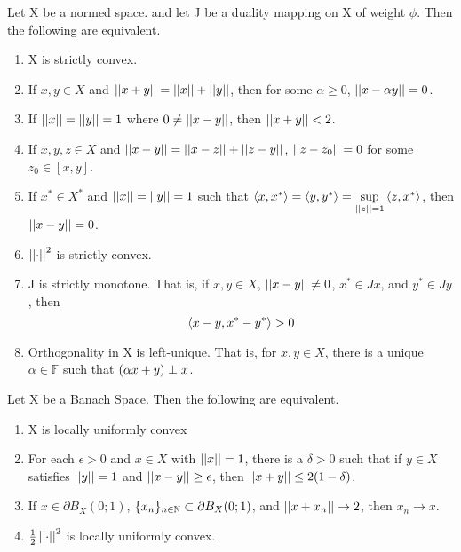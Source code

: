 \begin{prop}
    \label{prop:strictlyconvexspaces}
    Let X be a normed space. and let J be a duality mapping on X of weight $\phi$. Then the following are equivalent. 
    \begin{enumerate}
        \item X is strictly convex.
        \item If $x,y \in X$ and $\left|\left| x+y \right|\right| = \left|\left| x \right|\right|+\left|\left| y \right|\right|$, then for some $\alpha \geq 0$,  $\left|\left| x-\alpha y \right|\right| = 0$. 
        \item If $\left|\left| x \right|\right|=\left|\left| y \right|\right|=1$ where $0 \neq \left|\left| x-y \right|\right|$, then $\left|\left| x+y \right|\right| < 2$. 
        \item If $x,y,z \in X$ and $\left|\left| x-y \right|\right|= \left|\left| x-z \right|\right|+\left|\left| z-y \right|\right|$, $\left|\left| z-z_0 \right|\right|=0$ for some $z_0 \in [x,y]$. 
        \item If $x^* \in X^*$ and $\left|\left| x \right|\right|=\left|\left| y \right|\right|=1$ such that $\left\langle x,x^* \right\rangle=\left\langle y,y^* \right\rangle = \sup\limits_{\left|\left| z \right|\right|=1}\left\langle z,x^* \right\rangle$, then $\left|\left| x-y \right|\right|=0$. 
        \item $\left|\left| \cdot \right|\right|^2$ is strictly convex. 
        \item J is strictly monotone. That is, if $x,y \in X$, $\left|\left| x-y \right|\right| \neq 0$, $x^* \in Jx$, and $y^* \in Jy$, then 
        \begin{equation}
            \left\langle x-y,x^*-y^* \right\rangle > 0
        \end{equation}
        \item Orthogonality in X is left-unique. That is, for $x,y \in X$, there is a unique $\alpha \in \mathbb{F}$ such that $\left( \alpha x + y\right) \perp x$. 
    \end{enumerate} 
    
    
\end{prop}
\begin{prop}
    \label{prop:locallyuniformlyconvexspaces}
    Let X be a Banach Space. Then the following are equivalent. 
    \begin{enumerate}
        \item X is locally uniformly convex
        \item For each $\epsilon > 0$ and $x\in X$ with $\left|\left| x \right|\right|=1$, there is a $\delta > 0$ such that if $y \in X$ satisfies $\left|\left| y \right|\right|=1$ and $\left|\left| x-y \right|\right| \geq \epsilon$, then $\left|\left| x+y \right|\right| \leq 2(1-\delta)$. 
        \item If $x \in \partial B_X(0;1)$, $\{x_n\}_{n \in \mathbb{N}} \subset \partial B_X(0;1)$, and $\left|\left| x+x_n \right|\right| \to 2$, then $x_n \to x$. 
        \item $\frac{1}{2}\left|\left| \cdot \right|\right|^2$ is locally uniformly convex.
    \end{enumerate} 
\end{prop}
